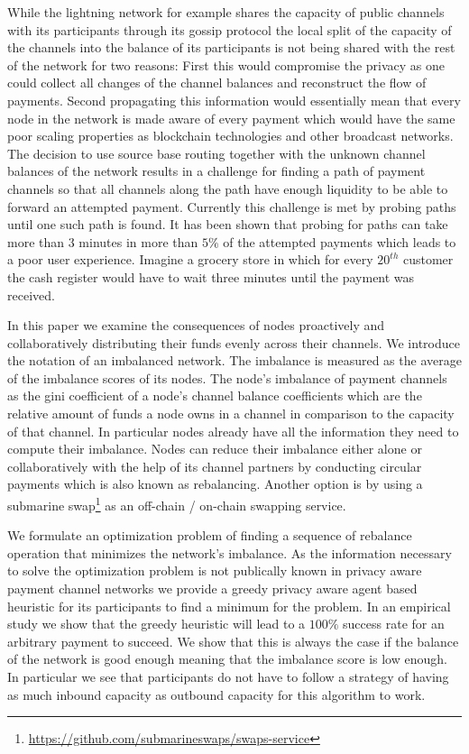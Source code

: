 \documentclass[a4paper]{paper}
\begin{document}
While the lightning network for example shares the capacity of public channels with its participants through its gossip protocol the local split of the capacity of the channels into the balance of its participants is not being shared with the rest of the network for two reasons:
First this would compromise the privacy as one could collect all changes of the channel balances and reconstruct the flow of payments.
Second propagating this information would essentially mean that every node in the network is made aware of every payment which would have the same poor scaling properties as blockchain technologies and other broadcast networks.
The decision to use source base routing together with the unknown channel balances of the network results in a challenge for finding a path of payment channels so that all channels along the path have enough liquidity to be able to forward an attempted payment.
Currently this challenge is met by probing paths until one such path is found.
It has been shown that probing for paths can take more than 3 minutes in more than $5\%$ of the attempted payments \cite{decker2019lnconf} which leads to a poor user experience.
Imagine a grocery store in which for every $20^{th}$ customer the cash register would have to wait three minutes until the payment was received.

In this paper we examine the consequences of nodes proactively and collaboratively distributing their funds evenly across their channels.
We introduce the notation of an imbalanced network.
The imbalance is measured as the average of the imbalance scores of its nodes.
The node's imbalance of payment channels as the gini coefficient of a node's channel balance coefficients which are the relative amount of funds a node owns in a channel in comparison to the capacity of that channel.
In particular nodes already have all the information they need to compute their imbalance. 
Nodes can reduce their imbalance either alone or collaboratively with the help of its channel partners by conducting circular payments which is also known as rebalancing.
Another option is by using a submarine swap\footnote{\url{https://github.com/submarineswaps/swaps-service}} as an off-chain / on-chain swapping service.

We formulate an optimization problem of finding a sequence of rebalance operation that minimizes the network's imbalance.
As the information necessary to solve the optimization problem is not publically known in privacy aware payment channel networks we provide a greedy privacy aware agent based heuristic for its participants to find a minimum for the problem. 
In an empirical study we show that the greedy heuristic will lead to a $100\%$ success rate for an arbitrary payment to succeed.
We show that this is always the case if the balance of the network is good enough meaning that the imbalance score is low enough.
In particular we see that participants do not have to follow a strategy of having as much inbound capacity as outbound capacity for this algorithm to work. 
\end{document}
